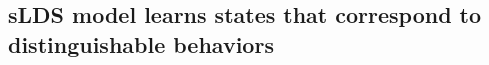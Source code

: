 \subsection{sLDS model learns states that correspond to distinguishable behaviors}
\label{sec:slds:3.2.3}